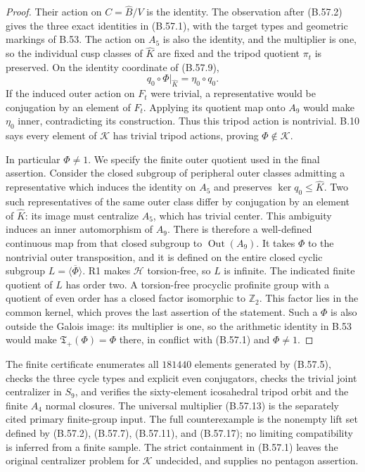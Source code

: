 \begin{proof}
Their action on $C=\widehat B/V$ is the identity.
The observation after (B.57.2) gives the three exact
identities in (B.57.1), with the target types and
geometric markings of B.53. The action on $A_5$ is
also the identity, and the multiplier is one, so
the individual cusp classes of $\widehat K$ are
fixed and the tripod quotient $\pi_t$ is preserved.
On the identity coordinate of (B.57.9),
\[
                   q_0\circ\Phi|_{\widehat K}
                                =\eta_0\circ q_0.         \tag{B.57.19}
\]
If the induced outer action on $F_t$ were trivial,
a representative would be conjugation by an element
of $F_t$. Applying its quotient map onto $A_9$
would make $\eta_0$ inner, contradicting its
construction. Thus this tripod action is nontrivial.
B.10 says every element of $\mathcal K$ has trivial
tripod actions, proving $\Phi\notin\mathcal K$.

In particular $\Phi\ne1$. We specify the finite outer
quotient used in the final assertion. Consider the
closed subgroup of peripheral outer classes admitting
a representative which induces the identity on $A_5$
and preserves $\ker q_0\leq\widehat K$.
Two such representatives of the same outer class differ
by conjugation by an element of $\widehat K$: its image
must centralize $A_5$, which has trivial center.
This ambiguity induces an inner automorphism of $A_9$.
There is therefore a well-defined continuous map from
that closed subgroup to $\operatorname{Out}(A_9)$.
It takes $\Phi$ to the nontrivial outer transposition,
and it is defined on the entire closed cyclic subgroup
$L=\overline{\langle\Phi\rangle}$.
R1 makes $\mathcal H$ torsion-free, so $L$ is infinite.
The indicated finite quotient of $L$ has order two.
A torsion-free procyclic profinite
group with a quotient of even order has a closed
factor isomorphic to $\mathbb Z_2$. This factor
lies in the common kernel, which proves the last
assertion of the statement. Such a $\Phi$ is also
outside the Galois image: its multiplier is one,
so the arithmetic identity in B.53 would make
$\mathfrak T_+(\Phi)=\Phi$ there, in conflict with
(B.57.1) and $\Phi\ne1$.
\end{proof}

The finite certificate enumerates all $181440$ elements
generated by (B.57.5), checks the three cycle types and
explicit even conjugators, checks the trivial joint
centralizer in $S_9$, and verifies the sixty-element
icosahedral tripod orbit and the finite $A_4$ normal
closures. The universal multiplier (B.57.13) is the
separately cited primary finite-group input. The full
counterexample is the nonempty lift set defined by
(B.57.2), (B.57.7), (B.57.11), and (B.57.17); no
limiting compatibility is inferred from a finite
sample. The strict containment in (B.57.1) leaves
the original centralizer problem for $\mathcal K$
undecided, and supplies no pentagon assertion.

